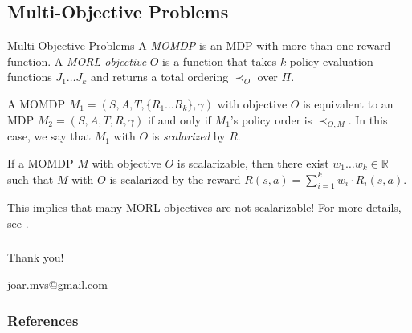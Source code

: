 \documentclass{beamer}
\begin{document}
\subsection{Multi-Objective Problems}
\begin{frame}{Multi-Objective Problems}
    \small
    A \emph{MOMDP} is an MDP with more than one reward function. A \emph{MORL objective} $O$ is a function that takes $k$ policy evaluation functions $J_1 \dots J_k$ and returns a total ordering $\prec_O$ over $\Pi$. 

    \vspace{0.5cm}
    A MOMDP $M_1 = (S,A,T,\{R_1 \dots R_k\},\gamma)$ with objective $O$ is equivalent to an MDP $M_2 = (S,A,T,R,\gamma)$ if and only if $M_1$'s policy order is $\prec_{O,M}$. In this case, we say that $M_1$ with $O$ is \emph{scalarized} by $R$.

    \vspace{0.5cm}
    \begin{theorem}\label{thm:morl_affine}
    If a MOMDP $M$ with objective $O$ is scalarizable, then there exist $w_1 \dots w_k \in \mathbb{R}$ such that $M$ with $O$ is scalarized by the reward $R(s,a) = \sum_{i=1}^k w_i \cdot R_i(s,a)$.
    \end{theorem}

    \vspace{0.5cm}
    This implies that many MORL objectives are not scalarizable! For more details, see \citet{pmlr-v216-skalse23a}.
\end{frame}



\begin{frame}
    \frametitle{}
    \centering
    
    \Large\color{oxfordblue}
    Thank you!

    \vspace{0.5cm}
    joar.mvs@gmail.com%

\end{frame}

\begin{frame}
\frametitle{References}
\tiny
\end{frame}


\end{document}
